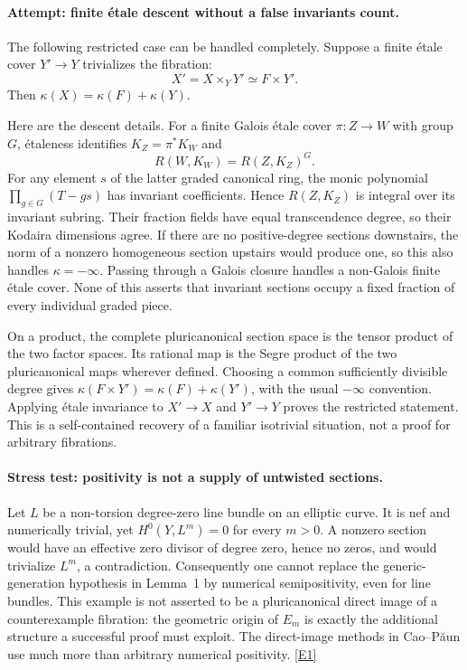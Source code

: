 \documentclass[11pt,a4paper]{article}
\newcommand{\eref}[2]{\hyperlink{extra:#1:#2}{[E#2]}}
\numberwithin{equation}{section}
\begin{document}
\paragraph{Attempt: finite \'etale descent without a false invariants count.}
The following restricted case can be handled completely. Suppose a finite
\'etale cover $Y'\to Y$ trivializes the fibration:
\[
 X'=X\times_Y Y'\simeq F\times Y'.
\]
Then $\kappa(X)=\kappa(F)+\kappa(Y)$.

Here are the descent details. For a finite Galois \'etale cover
$\pi:Z\to W$ with group $G$, \'etaleness identifies $K_Z=\pi^*K_W$ and
\[
 R(W,K_W)=R(Z,K_Z)^G.
\]
For any element $s$ of the latter graded canonical ring, the monic
polynomial $\prod_{g\in G}(T-gs)$ has invariant coefficients. Hence
$R(Z,K_Z)$ is integral over its invariant subring. Their fraction fields
have equal transcendence degree, so their Kodaira dimensions agree.
If there are no positive-degree sections downstairs, the norm of a
nonzero homogeneous section upstairs would produce one, so this also
handles $\kappa=-\infty$. Passing through a Galois closure handles a
non-Galois finite \'etale cover. None of this asserts that invariant
sections occupy a fixed fraction of every individual graded piece.

On a product, the complete pluricanonical section space is the tensor
product of the two factor spaces. Its rational map is the Segre product
of the two pluricanonical maps wherever defined. Choosing a common
sufficiently divisible degree gives
$\kappa(F\times Y')=\kappa(F)+\kappa(Y')$, with the usual $-\infty$
convention. Applying \'etale invariance to $X'\to X$ and $Y'\to Y$ proves
the restricted statement. This is a self-contained recovery of a familiar
isotrivial situation, not a proof for arbitrary fibrations.

\paragraph{Stress test: positivity is not a supply of untwisted sections.}
Let $L$ be a non-torsion degree-zero line bundle on an elliptic curve.
It is nef and numerically trivial, yet $H^0(Y,L^m)=0$ for every $m>0$.
A nonzero section would have an effective zero divisor of degree zero,
hence no zeros, and would trivialize $L^m$, a contradiction. Consequently
one cannot replace the generic-generation hypothesis in Lemma~1 by
numerical semipositivity, even for line bundles. This example is not
asserted to be a pluricanonical direct image of a counterexample fibration:
the geometric origin of $E_m$ is exactly the additional structure a
successful proof must exploit. The direct-image methods in
Cao--P\u{a}un use much more than arbitrary numerical positivity.
\eref{114}{1}
\end{document}
